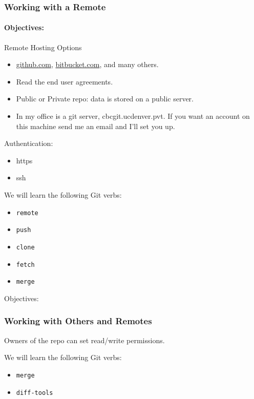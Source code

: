 \begin{frame}[t]
  \frametitle{Working with a Remote}
  \framesubtitle{Objectives:}
  Remote Hosting Options
  \begin{itemize}
    \item \url{github.com}, \url{bitbucket.com}, and many others.
    \item Read the end user agreements. 
    \item Public or Private repo: data is stored on a public server.
    \item In my office is a git server, cbcgit.ucdenver.pvt.  If you want an
      account on this machine send me an email and I'll set you up.
  \end{itemize}

  Authentication:
  \begin{itemize}
    \item https
    \item ssh
  \end{itemize}

  We will learn the following Git verbs:
  \begin{itemize}
    \item {\tt remote}
    \item {\tt push}
    \item {\tt clone}
    \item {\tt fetch}
    \item {\tt merge}
  \end{itemize} 
\end{frame}

\begin{frame}[t]{Objectives:}
  \frametitle{Working with Others and Remotes}
  Owners of the repo can set read/write permissions.

  We will learn the following Git verbs:
  \begin{itemize}
    \item {\tt merge}
    \item {\tt diff-tools}
  \end{itemize} 
\end{frame}

